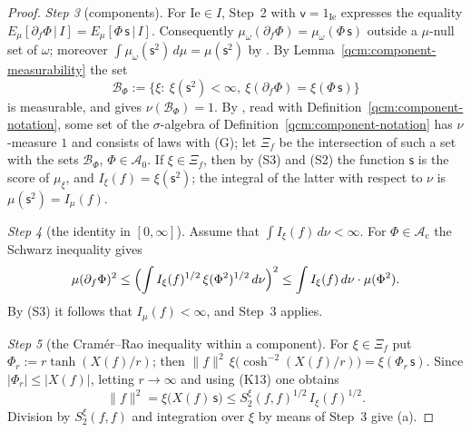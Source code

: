 \documentclass[11pt,letterpaper,reqno]{amsart}
\theoremstyle{definition}
\begin{document}
\begin{proof}
\emph{Step 3} (components).
For $\mathrm{Ie}\in I$, Step~2 with $\mathsf v=1_{\mathrm{Ie}}$ expresses the equality $E_\mu[\partial_f\Phi\,|\,I]=E_\mu[\Phi\,\mathsf s\,|\,I]$.
Consequently $\mu_\omega(\partial_f\Phi)=\mu_\omega(\Phi\,\mathsf s)$ outside a $\mu$-null set of $\omega$;
moreover $\int\mu_\omega(\mathsf s^2)\,d\mu=\mu(\mathsf s^2)$ by \cite[Theorem~A and Section~5]{ErgodicComponents}.
By Lemma~\ref{qcm:component-measurability} the set
\begin{equation*}
\mathcal B_\Phi:=\{\xi:\ \xi(\mathsf s^2)<\infty,\ \xi(\partial_f\Phi)=\xi(\Phi\,\mathsf s)\}
\end{equation*}
is measurable, and \cite[Theorem~A and Section~5]{ErgodicComponents} gives $\nu(\mathcal B_\Phi)=1$.
By \cite[Theorem~A and Section~6]{ErgodicComponents}, read with Definition~\ref{qcm:component-notation}, some set of the $\sigma$-algebra of Definition~\ref{qcm:component-notation} has $\nu$-measure $1$ and consists of laws with (G);
let $\Xi_f$ be the intersection of such a set with the sets $\mathcal B_\Phi$, $\Phi\in\mathcal A_0$.
If $\xi\in\Xi_f$, then by (S3) and (S2) the function $\mathsf s$ is the score of $\mu_\xi$, and $I_\xi(f)=\xi(\mathsf s^2)$;
the integral of the latter with respect to $\nu$ is $\mu(\mathsf s^2)=I_\mu(f)$.

\emph{Step 4} (the identity in $[0,\infty]$).
Assume that $\int I_\xi(f)\,d\nu<\infty$.
For $\Phi\in\mathcal A_{\mathrm c}$ the Schwarz inequality gives
\begin{equation*}
\mu(\partial_f\Phi)^2\le\Bigl(\int I_\xi(f)^{1/2}\,\xi(\Phi^2)^{1/2}\,d\nu\Bigr)^2\le\int I_\xi(f)\,d\nu\cdot\mu(\Phi^2).
\end{equation*}
By (S3) it follows that $I_\mu(f)<\infty$, and Step~3 applies.

\emph{Step 5} (the Cram\'er--Rao inequality within a component).
For $\xi\in\Xi_f$ put $\Phi_r:=r\tanh(X(f)/r)$;
then $\|f\|^2\,\allowbreak \xi\bigl(\cosh^{-2}(X(f)/r)\bigr)=\allowbreak \xi(\Phi_r\,\allowbreak \mathsf s)$.
Since $|\Phi_r|\le|X(f)|$, letting $r\to\infty$ and using (K13) one obtains
\begin{equation*}
\|f\|^2=\xi\bigl(X(f)\,\mathsf s\bigr)\le S_2^\xi(f,f)^{1/2}\,I_\xi(f)^{1/2}.
\end{equation*}
Division by $S_2^\xi(f,f)$ and integration over $\xi$ by means of Step~3 give (a).


\end{proof}
\end{document}
